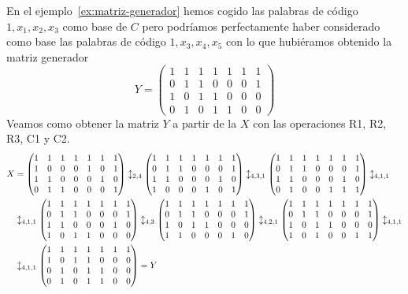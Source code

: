 \begin{example}
	En el ejemplo~\eqref{ex:matriz-generador} hemos cogido las palabras de código $1, x_1, x_2, x_3$ como base de $C$ pero podríamos perfectamente haber considerado como base las palabras de código $1, x_3, x_4, x_5$ con lo que hubiéramos obtenido la matriz generador
	\[
		Y=\begin{pmatrix*}
			  1&1&1&1&1&1&1\\
			  0&1&1&0&0&0&1\\
			  1&0&1&1&0&0&0\\
			  0&1&0&1&1&0&0
		\end{pmatrix*}
	\]
	Veamos como obtener la matriz $Y$ a partir de la $X$ con las operaciones R1, R2, R3, C1 y C2.
	\begin{align*}
		X&=\begin{pmatrix*}
			   1&1&1&1&1&1&1\\
			   1&0&0&0&1&0&1\\
			   1&1&0&0&0&1&0\\
			   0&1&1&0&0&0&1
		\end{pmatrix*}\Rr{2}{4}
		\begin{pmatrix*}
			1&1&1&1&1&1&1\\
			0&1&1&0&0&0&1\\
			1&1&0&0&0&1&0\\
			1&0&0&0&1&0&1
		\end{pmatrix*}\Rrrr{4}{3}{1}
		\begin{pmatrix*}
			1&1&1&1&1&1&1\\
			0&1&1&0&0&0&1\\
			1&1&0&0&0&1&0\\
			0&1&0&0&1&1&1
		\end{pmatrix*}\Rrrr{4}{1}{1}\\
		&\Rrrr{4}{1}{1}
		\begin{pmatrix*}
			1&1&1&1&1&1&1\\
			0&1&1&0&0&0&1\\
			1&1&0&0&0&1&0\\
			1&0&1&1&0&0&0
		\end{pmatrix*}\Rr{4}{3}
		\begin{pmatrix*}
			1&1&1&1&1&1&1\\
			0&1&1&0&0&0&1\\
			1&0&1&1&0&0&0\\
			1&1&0&0&0&1&0
		\end{pmatrix*}\Rrrr{4}{2}{1}
		\begin{pmatrix*}
			1&1&1&1&1&1&1\\
			0&1&1&0&0&0&1\\
			1&0&1&1&0&0&0\\
			1&0&1&0&0&1&1
		\end{pmatrix*}\Rrrr{4}{1}{1}\\
		&\Rrrr{4}{1}{1}
		\begin{pmatrix*}
			  1&1&1&1&1&1&1\\
			  1&0&1&1&0&0&0\\
			  0&1&0&1&1&0&0\\
			  0&1&0&1&1&0&0
		\end{pmatrix*}=Y
	\end{align*}

\end{example}